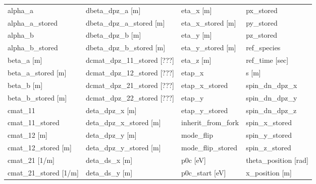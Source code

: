  \begin{tabular}{llll} \toprule
alpha_a                          & dbeta_dpz_a [m]                  & eta_x [m]                        & px_stored                        \\
alpha_a_stored                   & dbeta_dpz_a_stored [m]           & eta_x_stored [m]                 & py_stored                        \\
alpha_b                          & dbeta_dpz_b [m]                  & eta_y [m]                        & pz_stored                        \\
alpha_b_stored                   & dbeta_dpz_b_stored [m]           & eta_y_stored [m]                 & ref_species                      \\
beta_a [m]                       & dcmat_dpz_11_stored [???]        & eta_z [m]                        & ref_time [sec]                   \\
beta_a_stored [m]                & dcmat_dpz_12_stored [???]        & etap_x                           & s [m]                            \\
beta_b [m]                       & dcmat_dpz_21_stored [???]        & etap_x_stored                    & spin_dn_dpz_x                    \\
beta_b_stored [m]                & dcmat_dpz_22_stored [???]        & etap_y                           & spin_dn_dpz_y                    \\
cmat_11                          & deta_dpz_x [m]                   & etap_y_stored                    & spin_dn_dpz_z                    \\
cmat_11_stored                   & deta_dpz_x_stored [m]            & inherit_from_fork                & spin_x_stored                    \\
cmat_12 [m]                      & deta_dpz_y [m]                   & mode_flip                        & spin_y_stored                    \\
cmat_12_stored [m]               & deta_dpz_y_stored [m]            & mode_flip_stored                 & spin_z_stored                    \\
cmat_21 [1/m]                    & deta_ds_x [m]                    & p0c [eV]                         & theta_position [rad]             \\
cmat_21_stored [1/m]             & deta_ds_y [m]                    & p0c_start [eV]                   & x_position [m]                   \\

\end{tabular}

